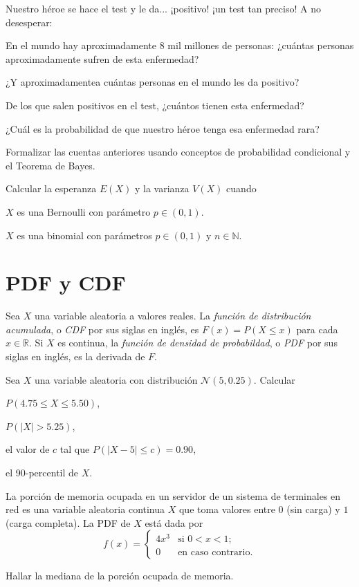 \documentclass[a4paper,oneside,fleqn,11pt]{article}
\newcommand\RR{\mathbb{R}}
\newcommand\NN{\mathbb{N}}
\newcommand\N{\mathcal{N}}
\begin{document}
\begin{ejercicios}
Nuestro héroe se hace el test y le da... ¡positivo! ¡un test tan preciso! A no
desesperar:

\begin{ejitems}
  \item En el mundo hay aproximadamente 8 mil millones de personas: ¿cuántas
  personas aproximadamente sufren de esta enfermedad?  
  \item ¿Y aproximadamentea cuántas personas en el mundo les da positivo?  
  \item De los que salen positivos en el test, ¿cuántos tienen esta enfermedad?
  \item ¿Cuál es la probabilidad de que nuestro héroe tenga esa enfermedad rara?
  \item Formalizar las cuentas anteriores usando conceptos de probabilidad condicional y el Teorema de Bayes.
\end{ejitems}

\item Calcular la esperanza $E(X)$ y la varianza $V(X)$ cuando
\begin{ejitems}
  \item $X$ es una Bernoulli con parámetro $p\in(0,1)$.
  \item $X$ es una binomial con parámetros $p\in(0,1)$ y $n\in\NN$.
\end{ejitems}


\section{PDF y CDF}

Sea $X$ una variable aleatoria a valores reales. La \emph{función de
distribución acumulada}, o \emph{CDF} por sus siglas en inglés, es $F(x) =
P(X\leq x)$ para cada $x\in\RR$.  Si $X$ es continua, la \emph{función de
densidad de probabildad}, o \emph{PDF} por sus siglas en inglés, es la
derivada de $F$.

\item
Sea $X$ una variable aleatoria con distribución $\N(5, 0.25)$. Calcular
\begin{ejitems}
    \item $P(4.75 \leq X \leq 5.50)$,
    \item $P(|X| > 5.25)$,
    \item el valor de $c$ tal que $P(|X - 5| \leq c) = 0.90$,
    \item el 90-percentil de $X$.
\end{ejitems}

\item
La porción de memoria ocupada en un servidor de un sistema de terminales en
red es una variable aleatoria continua $X$ que toma valores entre $0$ (sin
carga) y $1$ (carga completa). La PDF de $X$ está dada por 
\[
  f(x) = 
  \begin{cases}
    4x^3 & \text{si $0 < x < 1$;} \\
    0 & \text{en caso contrario.}
  \end{cases}
\]
\begin{ejitems}
  \item Hallar la mediana de la porción ocupada de memoria.
  

\end{ejitems}
\end{ejercicios}
\end{document}
